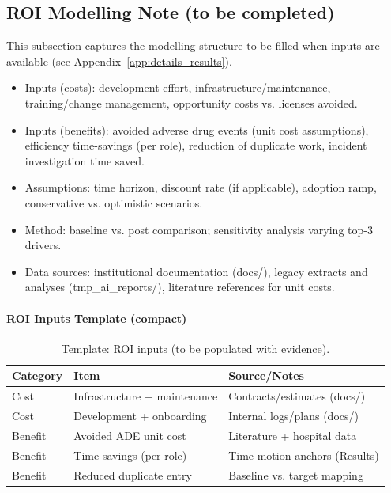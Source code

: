 \subsection*{ROI Modelling Note (to be completed)}
This subsection captures the modelling structure to be filled when inputs are available (see Appendix~\ref{app:details_results}).
\begin{itemize}
    \item Inputs (costs): development effort, infrastructure/maintenance, training/change management, opportunity costs vs. licenses avoided.
    \item Inputs (benefits): avoided adverse drug events (unit cost assumptions), efficiency time-savings (per role), reduction of duplicate work, incident investigation time saved.
    \item Assumptions: time horizon, discount rate (if applicable), adoption ramp, conservative vs. optimistic scenarios.
    \item Method: baseline vs. post comparison; sensitivity analysis varying top-3 drivers.
    \item Data sources: institutional documentation (docs/), legacy extracts and analyses (tmp\_ai\_reports/), literature references for unit costs.
\end{itemize}

\paragraph{ROI Inputs Template (compact)}
\begingroup\small
\begin{table}[H]
    \centering
    \caption{Template: ROI inputs (to be populated with evidence).}
    \label{tab:roi_inputs_template}
    {\setlength{\tabcolsep}{4pt}\renewcommand{\arraystretch}{1.15}
    \begin{tabularx}{\textwidth}{@{}>{\raggedright\arraybackslash}p{2.8cm} >{\raggedright\arraybackslash}p{5.2cm} >{\raggedright\arraybackslash}X@{}}
        \toprule
        \textbf{Category} & \textbf{Item} & \textbf{Source/Notes} \\
        \midrule
        Cost & Infrastructure + maintenance & Contracts/estimates (docs/) \\
        Cost & Development + onboarding & Internal logs/plans (docs/) \\
        Benefit & Avoided ADE unit cost & Literature + hospital data \\
        Benefit & Time-savings (per role) & Time-motion anchors (Results) \\
        Benefit & Reduced duplicate entry & Baseline vs. target mapping \\
        \bottomrule
    \end{tabularx}}
\end{table}
\endgroup

